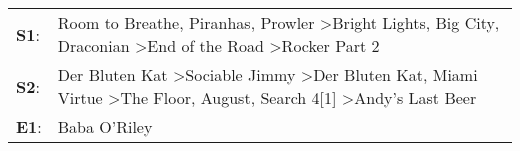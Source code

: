 \begin{supertabular}{p{0.03\textwidth}p{0.92\textwidth}}
 \textbf{S1}:  &                                                 Room to Breathe\textsuperscript{}, \enspace Piranhas\textsuperscript{}, \enspace Prowler\textsuperscript{} \textgreater \enspace Bright Lights, Big City\textsuperscript{}, \enspace Draconian\textsuperscript{} \textgreater \enspace End of the Road\textsuperscript{} \textgreater \enspace Rocker Part 2\textsuperscript{}  \enspace  \\
 \textbf{S2}:  &  Der Bluten Kat\textsuperscript{} \textgreater \enspace Sociable Jimmy\textsuperscript{} \textgreater \enspace Der Bluten Kat\textsuperscript{}, \enspace Miami Virtue\textsuperscript{} \textgreater \enspace The Floor\textsuperscript{}, \enspace August\textsuperscript{}, \enspace Search 4[1]\textsuperscript{} \textgreater \enspace Andy's Last Beer\textsuperscript{}  \enspace  \\
 \textbf{E1}:  &                                                                                                                                                                                                                                                                                                                                                 Baba O'Riley\textsuperscript{}  \enspace  \\
\end{supertabular}
